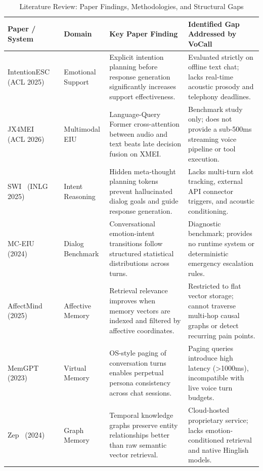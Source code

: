 \documentclass[conference]{IEEEtran}
\begin{document}
\begin{table}[t]
\centering
\caption{Literature Review: Paper Findings, Methodologies, and Structural Gaps}
\label{tab:paperfindings}
\footnotesize
\begin{tabularx}{\textwidth}{@{}p{3.2cm} p{2.2cm} p{5.5cm} X@{}}
\toprule
\textbf{Paper / System} & \textbf{Domain} & \textbf{Key Paper Finding} & \textbf{Identified Gap Addressed by VoCall} \\
\midrule
IntentionESC~\cite{intentionesc} (ACL 2025) & Emotional Support & Explicit intention planning before response generation significantly increases support effectiveness. & Evaluated strictly on offline text chat; lacks real-time acoustic prosody and telephony deadlines. \\
JX4MEI~\cite{jx4mei} (ACL 2026) & Multimodal EIU & Language-Query Former cross-attention between audio and text beats late decision fusion on XMEI. & Benchmark study only; does not provide a sub-500ms streaming voice pipeline or tool execution. \\
SWI~\cite{swi} (INLG 2025) & Intent Reasoning & Hidden meta-thought planning tokens prevent hallucinated dialog goals and guide response generation. & Lacks multi-turn slot tracking, external API connector triggers, and acoustic conditioning. \\
MC-EIU~\cite{mceiu} (2024) & Dialog Benchmark & Conversational emotion-intent transitions follow structured statistical distributions across turns. & Diagnostic benchmark; provides no runtime system or deterministic emergency escalation rules. \\
AffectMind~\cite{affectmind} (2025) & Affective Memory & Retrieval relevance improves when memory vectors are indexed and filtered by affective coordinates. & Restricted to flat vector storage; cannot traverse multi-hop causal graphs or detect recurring pain points. \\
MemGPT~\cite{memgpt} (2023) & Virtual Memory & OS-style paging of conversation turns enables perpetual persona consistency across chat sessions. & Paging queries introduce high latency (\textgreater{}1000ms), incompatible with live voice turn budgets. \\
Zep~\cite{zep} (2024) & Graph Memory & Temporal knowledge graphs preserve entity relationships better than raw semantic vector retrieval. & Cloud-hosted proprietary service; lacks emotion-conditioned retrieval and native Hinglish models. \\
\bottomrule
\end{tabularx}
\end{table}
\end{document}
